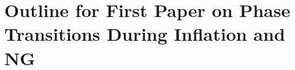 \documentclass[11pt]{article}
\begin{document}
\section{Outline for First Paper on Phase Transitions During Inflation and NG}
\end{document}
